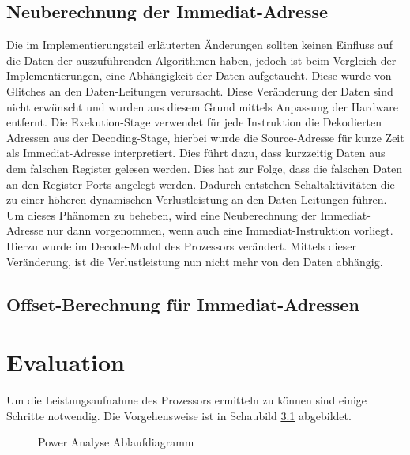 \section{Neuberechnung der Immediat-Adresse}
Die im Implementierungsteil erläuterten Änderungen sollten keinen Einfluss auf die Daten der auszuführenden Algorithmen haben, jedoch ist beim Vergleich der Implementierungen, eine Abhängigkeit der Daten aufgetaucht.
Diese wurde von Glitches an den Daten-Leitungen verursacht. Diese Veränderung der Daten sind nicht erwünscht und wurden aus diesem Grund mittels Anpassung der Hardware entfernt.
Die Exekution-Stage verwendet für jede Instruktion die Dekodierten Adressen aus der Decoding-Stage, hierbei wurde die Source-Adresse für kurze Zeit als Immediat-Adresse interpretiert. Dies führt dazu, dass kurzzeitig Daten aus dem falschen Register gelesen werden. Dies hat zur Folge, dass die falschen Daten an den Register-Ports angelegt werden. Dadurch entstehen Schaltaktivitäten die zu einer höheren dynamischen Verlustleistung an den Daten-Leitungen führen. Um dieses Phänomen zu beheben,  wird eine Neuberechnung der Immediat-Adresse nur dann vorgenommen, wenn auch eine Immediat-Instruktion vorliegt. Hierzu wurde im Decode-Modul des Prozessors verändert. 
Mittels dieser Veränderung, ist die Verlustleistung nun nicht mehr von den Daten abhängig.

\section{Offset-Berechnung für Immediat-Adressen}


\chapter{Evaluation}
\label{chap:evaluation} 

Um die Leistungsaufnahme des Prozessors ermitteln zu können sind einige Schritte notwendig. Die Vorgehensweise ist in Schaubild \ref{fig:flow_power_analyse} abgebildet.

\begin{scriptsize}
	\begin{figure}[htbp] 
		\centering
		
		\caption{Power Analyse Ablaufdiagramm}
		\label{fig:flow_power_analyse}
	\end{figure}
\end{scriptsize}

